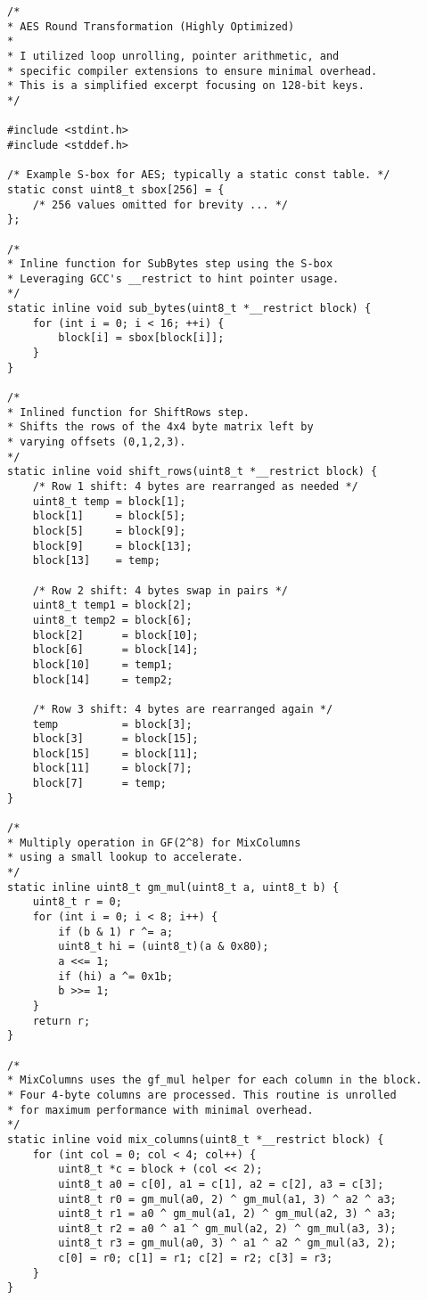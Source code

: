 \begin{lstlisting}
/* 
* AES Round Transformation (Highly Optimized)
* 
* I utilized loop unrolling, pointer arithmetic, and 
* specific compiler extensions to ensure minimal overhead.
* This is a simplified excerpt focusing on 128-bit keys.
*/

#include <stdint.h>
#include <stddef.h>

/* Example S-box for AES; typically a static const table. */
static const uint8_t sbox[256] = {
	/* 256 values omitted for brevity ... */
};

/* 
* Inline function for SubBytes step using the S-box 
* Leveraging GCC's __restrict to hint pointer usage.
*/
static inline void sub_bytes(uint8_t *__restrict block) {
	for (int i = 0; i < 16; ++i) {
		block[i] = sbox[block[i]];
	}
}

/*
* Inlined function for ShiftRows step.
* Shifts the rows of the 4x4 byte matrix left by
* varying offsets (0,1,2,3).
*/
static inline void shift_rows(uint8_t *__restrict block) {
	/* Row 1 shift: 4 bytes are rearranged as needed */
	uint8_t temp = block[1];
	block[1]     = block[5];
	block[5]     = block[9];
	block[9]     = block[13];
	block[13]    = temp;
	
	/* Row 2 shift: 4 bytes swap in pairs */
	uint8_t temp1 = block[2];
	uint8_t temp2 = block[6];
	block[2]      = block[10];
	block[6]      = block[14];
	block[10]     = temp1;
	block[14]     = temp2;
	
	/* Row 3 shift: 4 bytes are rearranged again */
	temp          = block[3];
	block[3]      = block[15];
	block[15]     = block[11];
	block[11]     = block[7];
	block[7]      = temp;
}

/* 
* Multiply operation in GF(2^8) for MixColumns 
* using a small lookup to accelerate. 
*/
static inline uint8_t gm_mul(uint8_t a, uint8_t b) {
	uint8_t r = 0;
	for (int i = 0; i < 8; i++) {
		if (b & 1) r ^= a;
		uint8_t hi = (uint8_t)(a & 0x80);
		a <<= 1;
		if (hi) a ^= 0x1b; 
		b >>= 1;
	}
	return r;
}

/*
* MixColumns uses the gf_mul helper for each column in the block.
* Four 4-byte columns are processed. This routine is unrolled 
* for maximum performance with minimal overhead.
*/
static inline void mix_columns(uint8_t *__restrict block) {
	for (int col = 0; col < 4; col++) {
		uint8_t *c = block + (col << 2);
		uint8_t a0 = c[0], a1 = c[1], a2 = c[2], a3 = c[3];
		uint8_t r0 = gm_mul(a0, 2) ^ gm_mul(a1, 3) ^ a2 ^ a3;
		uint8_t r1 = a0 ^ gm_mul(a1, 2) ^ gm_mul(a2, 3) ^ a3;
		uint8_t r2 = a0 ^ a1 ^ gm_mul(a2, 2) ^ gm_mul(a3, 3);
		uint8_t r3 = gm_mul(a0, 3) ^ a1 ^ a2 ^ gm_mul(a3, 2);
		c[0] = r0; c[1] = r1; c[2] = r2; c[3] = r3;
	}
}


\end{lstlisting}
